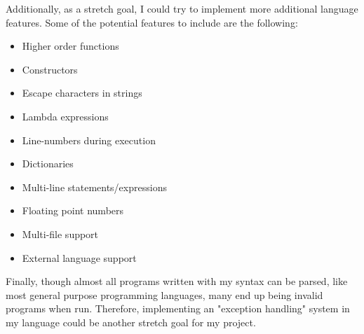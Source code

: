 \documentclass{article}
\begin{document}
Additionally, as a stretch goal, I could try to implement more additional language features. Some of the potential features to include are the following:
\begin{itemize}
    \item Higher order functions
    \item Constructors
    \item Escape characters in strings
    \item Lambda expressions
    \item Line-numbers during execution
    \item Dictionaries
    \item Multi-line statements/expressions
    \item Floating point numbers
    \item Multi-file support
    \item External language support
\end{itemize}

Finally, though almost all programs written with my syntax can be parsed, like most general purpose programming languages, many end up being invalid programs when run. Therefore, implementing an "exception handling" system in my language could be another stretch goal for my project.
\end{document}
